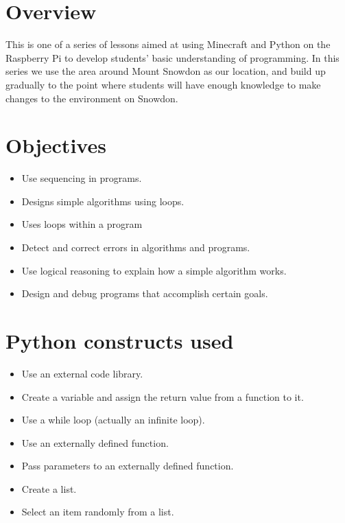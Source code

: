 \documentclass{geocraft-lesson-plan}
\begin{document}
\subtitle{Part 2 - Iteration}

\section*{Overview} This is one of a series of lessons aimed at using Minecraft and Python on the Raspberry Pi to
develop students’ basic understanding of programming. In this series we use the area around Mount Snowdon as our
location, and build up gradually to the point where students will have enough knowledge to make changes to the
environment on Snowdon.  

\section*{Objectives}
\begin{itemize}
\item Use sequencing in programs.
\item Designs simple algorithms using loops.
\item Uses loops within a program
\item Detect and correct errors in algorithms and programs.
\item Use logical reasoning to explain how a simple algorithm works. 
\item Design and debug programs that accomplish certain goals.
\end{itemize}

\section*{Python constructs used}
\begin{itemize}
\item Use an external code library.
\item Create a variable and assign the return value from a function to it.
\item Use a while loop (actually an infinite loop).
\item Use an externally defined function.
\item Pass parameters to an externally defined function.
\item Create a list.
\item Select an item randomly from a list.
\end{itemize}
\end{document}
